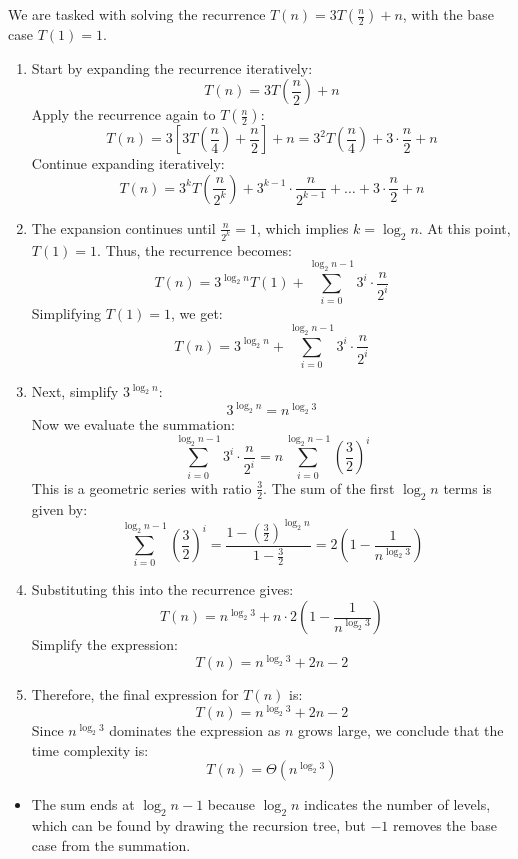 \begin{example}
    We are tasked with solving the recurrence \( T(n) = 3T\left(\frac{n}{2}\right) + n \), with the base case \( T(1) = 1 \).

    \begin{enumerate}[label=\arabic*)]
        \item Start by expanding the recurrence iteratively:
        \[
        T(n) = 3T\left(\frac{n}{2}\right) + n
        \]
        Apply the recurrence again to \( T\left(\frac{n}{2}\right) \):
        \[
        T(n) = 3 \left[ 3T\left(\frac{n}{4}\right) + \frac{n}{2} \right] + n = 3^2 T\left(\frac{n}{4}\right) + 3 \cdot \frac{n}{2} + n
        \]
        Continue expanding iteratively:
        \[
        T(n) = 3^k T\left(\frac{n}{2^k}\right) + 3^{k-1} \cdot \frac{n}{2^{k-1}} + \dots + 3 \cdot \frac{n}{2} + n
        \]
        
        \item The expansion continues until \( \frac{n}{2^k} = 1 \), which implies \( k = \log_2 n \). At this point, \( T(1) = 1 \). Thus, the recurrence becomes:
        \[
        T(n) = 3^{\log_2 n} T(1) + \sum_{i=0}^{\log_2 n - 1} 3^i \cdot \frac{n}{2^i}
        \]
        Simplifying \( T(1) = 1 \), we get:
        \[
        T(n) = 3^{\log_2 n} + \sum_{i=0}^{\log_2 n - 1} 3^i \cdot \frac{n}{2^i}
        \]

        \item Next, simplify \( 3^{\log_2 n} \):
        \[
        3^{\log_2 n} = n^{\log_2 3}
        \]
        Now we evaluate the summation:
        \[
        \sum_{i=0}^{\log_2 n - 1} 3^i \cdot \frac{n}{2^i} = n \sum_{i=0}^{\log_2 n - 1} \left(\frac{3}{2}\right)^i
        \]
        This is a geometric series with ratio \( \frac{3}{2} \). The sum of the first \( \log_2 n \) terms is given by:
        \[
        \sum_{i=0}^{\log_2 n - 1} \left(\frac{3}{2}\right)^i = \frac{1 - \left(\frac{3}{2}\right)^{\log_2 n}}{1 - \frac{3}{2}} = 2 \left( 1 - \frac{1}{n^{\log_2 3}} \right)
        \]
        
        \item Substituting this into the recurrence gives:
        \[
        T(n) = n^{\log_2 3} + n \cdot 2 \left(1 - \frac{1}{n^{\log_2 3}}\right)
        \]
        Simplify the expression:
        \[
        T(n) = n^{\log_2 3} + 2n - 2
        \]

        \item Therefore, the final expression for \( T(n) \) is:
        \[
        T(n) = n^{\log_2 3} + 2n - 2
        \]
        Since \( n^{\log_2 3} \) dominates the expression as \( n \) grows large, we conclude that the time complexity is:
        \[
        T(n) = \Theta(n^{\log_2 3})
        \]
    \end{enumerate}
    \begin{itemize}
        \item The sum ends at $\log_2 n - 1$ because $\log_2 n$ indicates the number of levels, which can be found by drawing the recursion tree, but $-1$ removes the base case from the summation. 
    \end{itemize}
\end{example}

